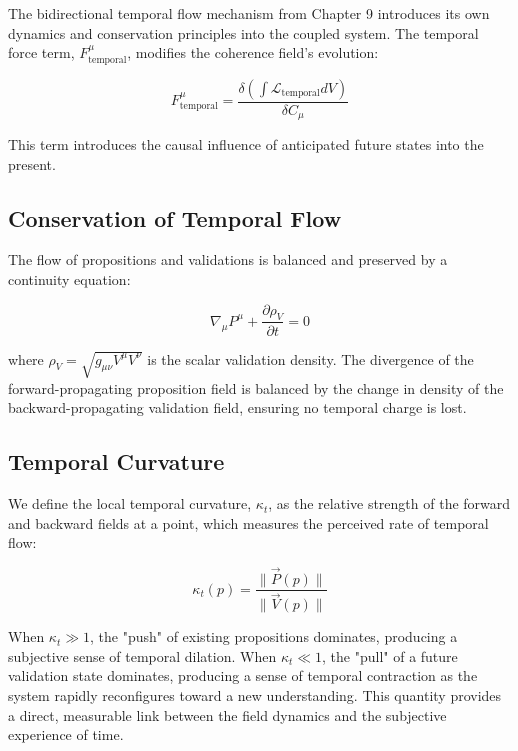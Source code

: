 The bidirectional temporal flow mechanism from Chapter 9 introduces its own dynamics and conservation principles into the coupled system. The temporal force term, \(F^\mu_{\text{temporal}}\), modifies the coherence field's evolution:

\begin{equation}
F^\mu_{\text{temporal}} = \frac{\delta(\int \mathcal{L}_{\text{temporal}} dV)}{\delta C_\mu}
\end{equation}

This term introduces the causal influence of anticipated future states into the present.


\subsection{Conservation of Temporal Flow}
\label{10.5.1:conservation_of_temporal_flow}

The flow of propositions and validations is balanced and preserved by a continuity equation:

\begin{equation}
\nabla_\mu P^\mu + \frac{\partial \rho_V}{\partial t} = 0
\end{equation}

where \(\rho_V = \sqrt{g_{\mu\nu} V^{\mu} V^{\nu}}\) is the scalar validation density. The divergence of the forward-propagating proposition field is balanced by the change in density of the backward-propagating validation field, ensuring no temporal charge is lost.


\subsection{Temporal Curvature}
\label{10.5.2:temporal_curvature}

We define the local temporal curvature, \(\kappa_t\), as the relative strength of the forward and backward fields at a point, which measures the perceived rate of temporal flow:

\begin{equation}
\kappa_t(p) = \frac{\|\vec{P}(p)\|}{\|\vec{V}(p)\|}
\end{equation}

When \(\kappa_t \gg 1\), the "push" of existing propositions dominates, producing a subjective sense of temporal dilation. When \(\kappa_t \ll 1\), the "pull" of a future validation state dominates, producing a sense of temporal contraction as the system rapidly reconfigures toward a new understanding. This quantity provides a direct, measurable link between the field dynamics and the subjective experience of time. 

